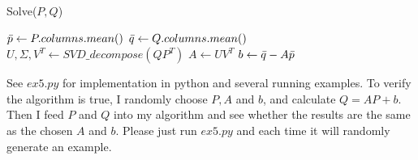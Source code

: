 \documentclass[
  course = {{16-811 Math Fundamentals for Robotics}},
  quartile = {{1}},
  assignment = 1,
  name = {{Kangle Deng}},
  email = {{kangled@andrew.cmu.edu}},
  firstexercise = 1
]{aga-homework}
\begin{document}
\begin{algorithm}[H]
  \caption{Solve($P, Q$)}

  $\Bar{p} \leftarrow P.columns.mean()$ \;
  $\Bar{q} \leftarrow Q.columns.mean()$ \;
  $U, \Sigma, V^T \leftarrow SVD\_decompose(QP^T)$ \;
  $A \leftarrow UV^T$ \;
  $b \leftarrow \Bar{q} - A\Bar{p}$ \;
\end{algorithm}

See $ex5.py$ for implementation in python and several running examples. To verify the algorithm is true, I randomly choose $P, A$ and $b$, and calculate $Q = AP+b$. Then I feed $P$ and $Q$ into my algorithm and see whether the results are the same as the chosen $A$ and $b$. Please just run $ex5.py$ and each time it will randomly generate an example.




\end{document}

